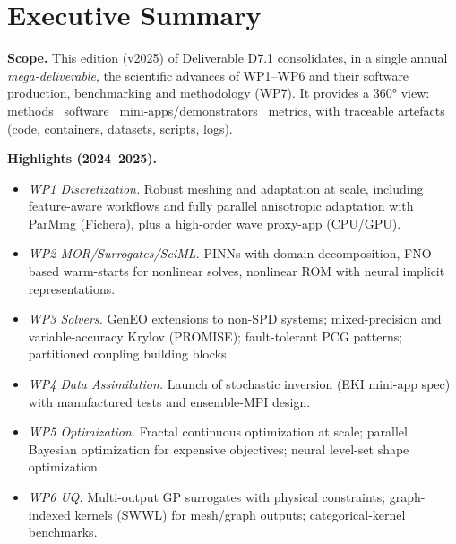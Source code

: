 \clearpage
\section*{Executive Summary}
\label{sec:summary}

\noindent
\textbf{Scope.} This edition (v2025) of Deliverable D7.1 consolidates, in a single annual
\emph{mega-deliverable}, the scientific advances of WP1--WP6 and their software production,
benchmarking and methodology (WP7). It provides a 360° view: methods \textrightarrow\ software
\textrightarrow\ mini-apps/demonstrators \textrightarrow\ metrics, with traceable artefacts (code, containers,
datasets, scripts, logs). %
% 

\medskip
\noindent
\textbf{Highlights (2024--2025).}
\begin{itemize}
  \item \emph{WP1 Discretization.} Robust meshing and adaptation at scale, including
        feature-aware workflows and fully parallel anisotropic adaptation with ParMmg (Fichera),
        plus a high-order wave proxy-app (CPU/GPU). %
  \item \emph{WP2 MOR/Surrogates/SciML.} PINNs with domain decomposition, FNO-based
        warm-starts for nonlinear solves, nonlinear ROM with neural implicit representations. %
  \item \emph{WP3 Solvers.} GenEO extensions to non-SPD systems; mixed-precision and
        variable-accuracy Krylov (PROMISE); fault-tolerant PCG patterns; partitioned coupling
        building blocks. %
  \item \emph{WP4 Data Assimilation.} Launch of stochastic inversion (EKI mini-app spec) with
        manufactured tests and ensemble-MPI design. %
  \item \emph{WP5 Optimization.} Fractal continuous optimization at scale; parallel Bayesian
        optimization for expensive objectives; neural level-set shape optimization. %
  \item \emph{WP6 UQ.} Multi-output GP surrogates with physical constraints; graph-indexed
        kernels (SWWL) for mesh/graph outputs; categorical-kernel benchmarks. %
\end{itemize}

